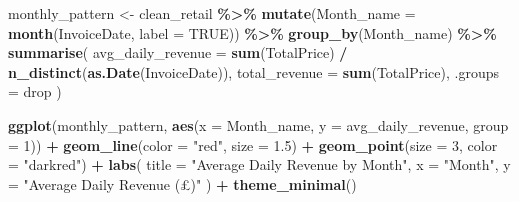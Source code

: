 \documentclass[
]{article}
\newenvironment{Shaded}{\begin{snugshade}}{\end{snugshade}}
\newcommand{\AttributeTok}[1]{\textcolor[rgb]{0.13,0.29,0.53}{#1}}
\newcommand{\ConstantTok}[1]{\textcolor[rgb]{0.56,0.35,0.01}{#1}}
\newcommand{\DecValTok}[1]{\textcolor[rgb]{0.00,0.00,0.81}{#1}}
\newcommand{\FloatTok}[1]{\textcolor[rgb]{0.00,0.00,0.81}{#1}}
\newcommand{\FunctionTok}[1]{\textcolor[rgb]{0.13,0.29,0.53}{\textbf{#1}}}
\newcommand{\NormalTok}[1]{#1}
\newcommand{\OtherTok}[1]{\textcolor[rgb]{0.56,0.35,0.01}{#1}}
\newcommand{\SpecialCharTok}[1]{\textcolor[rgb]{0.81,0.36,0.00}{\textbf{#1}}}
\newcommand{\StringTok}[1]{\textcolor[rgb]{0.31,0.60,0.02}{#1}}
\begin{document}
\begin{Shaded}
\begin{Highlighting}[]
\NormalTok{monthly\_pattern }\OtherTok{\textless{}{-}}\NormalTok{ clean\_retail }\SpecialCharTok{\%\textgreater{}\%}
  \FunctionTok{mutate}\NormalTok{(}\AttributeTok{Month\_name =} \FunctionTok{month}\NormalTok{(InvoiceDate, }\AttributeTok{label =} \ConstantTok{TRUE}\NormalTok{)) }\SpecialCharTok{\%\textgreater{}\%}
  \FunctionTok{group\_by}\NormalTok{(Month\_name) }\SpecialCharTok{\%\textgreater{}\%}
  \FunctionTok{summarise}\NormalTok{(}
    \AttributeTok{avg\_daily\_revenue =} \FunctionTok{sum}\NormalTok{(TotalPrice) }\SpecialCharTok{/} \FunctionTok{n\_distinct}\NormalTok{(}\FunctionTok{as.Date}\NormalTok{(InvoiceDate)),}
    \AttributeTok{total\_revenue =} \FunctionTok{sum}\NormalTok{(TotalPrice),}
    \AttributeTok{.groups =} \StringTok{\textquotesingle{}drop\textquotesingle{}}
\NormalTok{  )}

\FunctionTok{ggplot}\NormalTok{(monthly\_pattern, }\FunctionTok{aes}\NormalTok{(}\AttributeTok{x =}\NormalTok{ Month\_name, }\AttributeTok{y =}\NormalTok{ avg\_daily\_revenue, }\AttributeTok{group =} \DecValTok{1}\NormalTok{)) }\SpecialCharTok{+}
  \FunctionTok{geom\_line}\NormalTok{(}\AttributeTok{color =} \StringTok{"red"}\NormalTok{, }\AttributeTok{size =} \FloatTok{1.5}\NormalTok{) }\SpecialCharTok{+}
  \FunctionTok{geom\_point}\NormalTok{(}\AttributeTok{size =} \DecValTok{3}\NormalTok{, }\AttributeTok{color =} \StringTok{"darkred"}\NormalTok{) }\SpecialCharTok{+}
  \FunctionTok{labs}\NormalTok{(}
    \AttributeTok{title =} \StringTok{"Average Daily Revenue by Month"}\NormalTok{, }
    \AttributeTok{x =} \StringTok{"Month"}\NormalTok{, }\AttributeTok{y =} \StringTok{"Average Daily Revenue (£)"}
\NormalTok{  ) }\SpecialCharTok{+}
  \FunctionTok{theme\_minimal}\NormalTok{()}
\end{Highlighting}
\end{Shaded}
\end{document}
